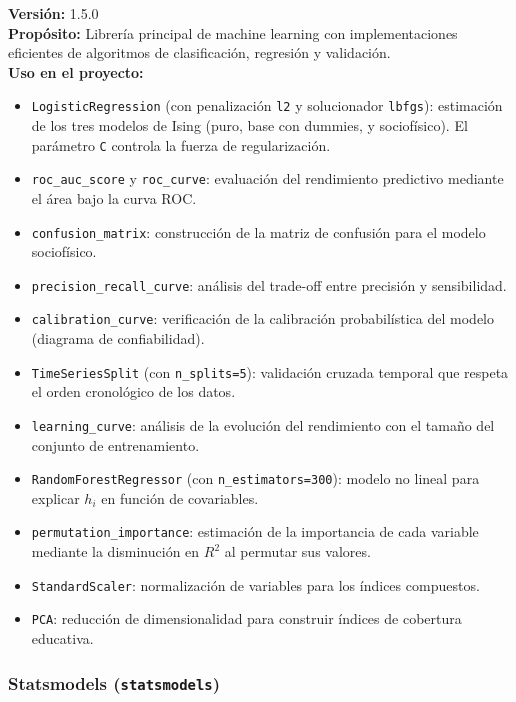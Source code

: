 \documentclass[12pt,a4paper]{article}
\begin{document}
\textbf{Versión:} 1.5.0\\
\textbf{Propósito:} Librería principal de machine learning con implementaciones eficientes de algoritmos de clasificación, regresión y validación.\\
\textbf{Uso en el proyecto:}
\begin{itemize}
    \item \texttt{LogisticRegression} (con penalización \texttt{l2} y solucionador \texttt{lbfgs}): estimación de los tres modelos de Ising (puro, base con dummies, y sociofísico). El parámetro \texttt{C} controla la fuerza de regularización.
    \item \texttt{roc\_auc\_score} y \texttt{roc\_curve}: evaluación del rendimiento predictivo mediante el área bajo la curva ROC.
    \item \texttt{confusion\_matrix}: construcción de la matriz de confusión para el modelo sociofísico.
    \item \texttt{precision\_recall\_curve}: análisis del trade-off entre precisión y sensibilidad.
    \item \texttt{calibration\_curve}: verificación de la calibración probabilística del modelo (diagrama de confiabilidad).
    \item \texttt{TimeSeriesSplit} (con \texttt{n\_splits=5}): validación cruzada temporal que respeta el orden cronológico de los datos.
    \item \texttt{learning\_curve}: análisis de la evolución del rendimiento con el tamaño del conjunto de entrenamiento.
    \item \texttt{RandomForestRegressor} (con \texttt{n\_estimators=300}): modelo no lineal para explicar $h_i$ en función de covariables.
    \item \texttt{permutation\_importance}: estimación de la importancia de cada variable mediante la disminución en $R^2$ al permutar sus valores.
    \item \texttt{StandardScaler}: normalización de variables para los índices compuestos.
    \item \texttt{PCA}: reducción de dimensionalidad para construir índices de cobertura educativa.
\end{itemize}

\subsubsection{Statsmodels (\texttt{statsmodels})}
\end{document}
